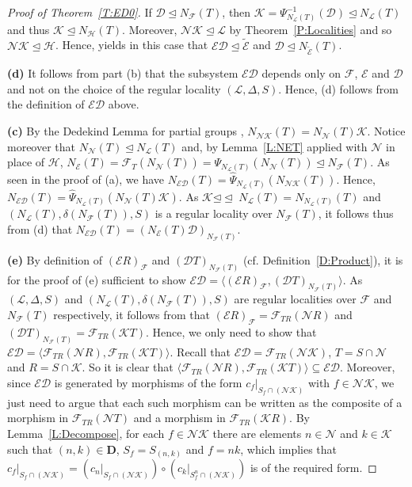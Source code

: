 \documentclass[reqno,11pt]{amsart}
\numberwithin{equation}{section}
\theoremstyle{definition}
\newcommand{\F}{\mathcal{F}}
\newcommand{\E}{\mathcal{E}}
\renewcommand{\L}{\mathcal{L}}
\newcommand{\N}{\mathcal{N}}
\newcommand{\K}{\mathcal{K}}
\newcommand{\D}{\mathbf{D}}
\renewcommand{\H}{\mathcal{H}}
\newcommand{\mD}{\mathcal{D}}
\newcommand{\tE}{\widetilde{\E}}
\def \<{\langle }
\def \>{\rangle }
\newcommand{\subn}{{\unlhd\!\unlhd\;}}
\begin{document}
\begin{proof}[Proof of Theorem~\ref{T:ED0}]
\smallskip

If $\mD\unlhd N_\F(T)$, then $\K=\Psi_{N_\L(T)}^{-1}(\mD)\unlhd N_\L(T)$ and thus $\K\unlhd N_\H(T)$. Moreover, $\N\K\unlhd\L$ by Theorem~\ref{P:Localities} and so $\N\K\unlhd\H$. Hence, \cite[Proposition~7.1(c)]{Chermak/Henke} yields in this case that $\E\mD\unlhd\tE$ and $\mD\unlhd N_{\tE}(T)$.

\smallskip

\textbf{(d)} It follows from part (b) that the subsystem $\E\mD$ depends only on $\F$, $\E$ and $\mD$ and not on the choice of the regular locality $(\L,\Delta,S)$. Hence, (d) follows from the definition of $\E\mD$ above.

\smallskip

\textbf{(c)} By the Dedekind Lemma for partial groups \cite[Lemma~1.10]{Chermak:2015}, $N_{\N\K}(T)=N_\N(T)\K$. Notice moreover that $N_\N(T)\unlhd N_\L(T)$ and, by Lemma~\ref{L:NET} applied with $\N$ in place of $\H$, $N_\E(T)=\F_T(N_\N(T))=\Psi_{N_\L(T)}(N_\N(T))\unlhd N_\F(T)$. As seen in the proof of (a), we have $N_{\E\mD}(T)=\hat{\Psi}_{N_\L(T)}(N_{\N\K}(T))$. Hence, $N_{\E\mD}(T)=\hat{\Psi}_{N_\L(T)}(N_\N(T)\K)$. As $\K\subn N_\L(T)=N_{N_\L(T)}(T)$ and $(N_\L(T),\delta(N_\F(T)),S)$ is a regular locality over $N_\F(T)$, it follows thus from (d) that $N_{\E\mD}(T)=(N_\E(T)\mD)_{N_\F(T)}$.

\smallskip

\textbf{(e)} By definition of $(\E R)_\F$ and $(\mD T)_{N_\F(T)}$ (cf. Definition~\ref{D:Product}), it is for the proof of (e) sufficient to show $\E\mD=\<(\E R)_\F,(\mD T)_{N_\F(T)}\>$. As $(\L,\Delta,S)$ and $(N_\L(T),\delta(N_\F(T)),S)$ are regular localities over $\F$ and $N_\F(T)$ respectively, it follows from \cite[Proposition~8.2]{Chermak/Henke} that $(\E R)_\F=\F_{TR}(\N R)$ and $(\mD T)_{N_\F(T)}=\F_{TR}(\K T)$. Hence, we only need to show that $\E\mD=\<\F_{TR}(\N R),\F_{TR}(\K T)\>$. Recall that $\E\mD=\F_{TR}(\N\K)$, $T=S\cap\N$ and $R=S\cap \K$. So it is clear that $\<\F_{TR}(\N R),\F_{TR}(\K T)\>\subseteq\E\mD$. Moreover, since $\E\mD$ is generated by morphisms of the form $c_f|_{S_f\cap(\N\K)}$ with $f\in\N\K$, we just need to argue that each such morphism can be written as the composite of a morphism in $\F_{TR}(\N T)$ and a morphism in $\F_{TR}(\K R)$. By Lemma~\ref{L:Decompose}, for each $f\in\N\K$ there are elements $n\in\N$ and $k\in\K$ such that $(n,k)\in\D$, $S_f=S_{(n,k)}$ and $f=nk$, which implies that $c_f|_{S_f\cap (\N\K)}=(c_n|_{S_f\cap (\N\K)})\circ (c_k|_{S_f^n\cap (\N\K)})$ is of the required form.
\end{proof}
\end{document}
